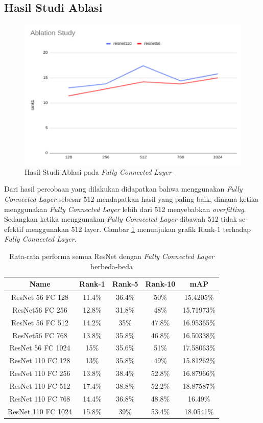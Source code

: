 \subsection{Hasil Studi Ablasi}
\vspace{1ex}

\begin{figure} [!htb]
	\centering
	\includegraphics[scale=0.43]{img/ablation.png}
	\caption{Hasil Studi Ablasi pada \textit{Fully Connected Layer}}
	\label{fig: fclayer}
\end{figure}

Dari hasil percobaan yang dilakukan didapatkan bahwa menggunakan \textit{Fully Connected Layer} sebesar 512 mendapatkan hasil yang paling baik, dimana ketika menggunakan \textit{Fully Connected Layer} lebih dari 512 menyebabkan \textit{overfitting}. Sedangkan ketika menggunakan \textit{Fully Connected Layer} dibawah 512 tidak se-efektif menggunakan 512 layer. Gambar \ref{fig: fclayer} menunjukan grafik Rank-1 terhadap \textit{Fully Connected Layer}.

\begin{longtable}{|c|c|c|c|c|}
	\caption{Rata-rata performa semua ResNet dengan \textit{Fully Connected Layer} berbeda-beda}
	\label{tabel: 18}\\
	\hline
	\rowcolor[HTML]{C0C0C0}
	\textbf{Name} & \textbf{Rank-1} & \textbf{Rank-5} & \textbf{Rank-10} & \textbf{mAP} \\ \hline
	ResNet 56 FC 128 & 11.4\% & 36.4\% & 50\% & 15.4205\%\\ \hline
	ResNet56 FC 256 & 12.8\% & 31.8\% & 48\% & 15.71973\%\\ \hline
	ResNet 56 FC 512 & 14.2\% & 35\% & 47.8\% & 16.95365\%\\ \hline
	ResNet56 FC 768 & 13.8\% & 35.8\% & 46.8\% & 16.50338\%\\ \hline
	ResNet 56 FC 1024 & 15\% & 35.6\% & 51\% & 17.58063\%\\ \hline
	ResNet 110 FC 128 & 13\% & 35.8\% & 49\% & 15.81262\%\\ \hline
	ResNet 110 FC 256 & 13.8\% & 38.4\% & 52.8\% & 16.87966\%\\ \hline
	ResNet 110 FC 512 & 17.4\% & 38.8\% & 52.2\% & 18.87587\%\\ \hline
	ResNet 110 FC 768 & 14.4\% & 36.8\% & 48.8\% & 16.49\%\\ \hline
	ResNet 110 FC 1024 & 15.8\% & 39\% & 53.4\% & 18.0541\%\\ \hline
\end{longtable}

